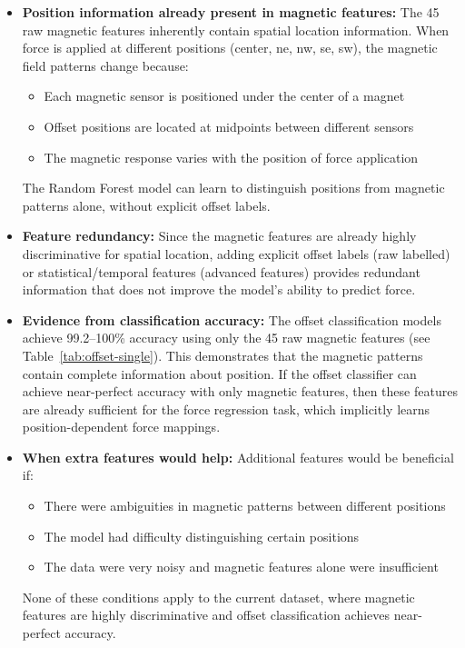 \documentclass[11pt,a4paper]{article}
\begin{document}
\begin{itemize}[leftmargin=1.5em]
    \item \textbf{Position information already present in magnetic features:} The 45 raw magnetic features inherently contain spatial location information. When force is applied at different positions (center, ne, nw, se, sw), the magnetic field patterns change because:
    \begin{itemize}[leftmargin=1.5em]
        \item Each magnetic sensor is positioned under the center of a magnet
        \item Offset positions are located at midpoints between different sensors
        \item The magnetic response varies with the position of force application
    \end{itemize}
    The Random Forest model can learn to distinguish positions from magnetic patterns alone, without explicit offset labels.
    
    \item \textbf{Feature redundancy:} Since the magnetic features are already highly discriminative for spatial location, adding explicit offset labels (raw labelled) or statistical/temporal features (advanced features) provides redundant information that does not improve the model's ability to predict force.
    
    \item \textbf{Evidence from classification accuracy:} The offset classification models achieve 99.2--100\% accuracy using only the 45 raw magnetic features (see Table~\ref{tab:offset-single}). This demonstrates that the magnetic patterns contain complete information about position. If the offset classifier can achieve near-perfect accuracy with only magnetic features, then these features are already sufficient for the force regression task, which implicitly learns position-dependent force mappings.
    
    \item \textbf{When extra features would help:} Additional features would be beneficial if:
    \begin{itemize}[leftmargin=1.5em]
        \item There were ambiguities in magnetic patterns between different positions
        \item The model had difficulty distinguishing certain positions
        \item The data were very noisy and magnetic features alone were insufficient
    \end{itemize}
    None of these conditions apply to the current dataset, where magnetic features are highly discriminative and offset classification achieves near-perfect accuracy.
\end{itemize}
\end{document}

